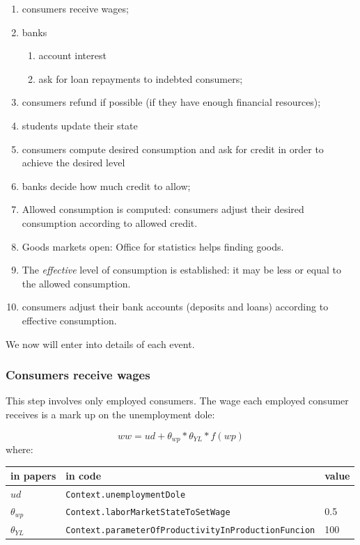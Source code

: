 \documentclass{book}
\begin{document}
\begin{enumerate}
	\item consumers receive wages;
	\item banks 
		\begin{enumerate}
			\item account interest
			\item ask for loan repayments to indebted consumers;
		\end{enumerate}
	\item consumers refund if possible (if they have enough financial resources);
	\item students update their state
	\item consumers compute desired consumption and ask for credit in order to achieve the desired level 
	\item banks decide how much credit to allow;
	\item Allowed consumption is computed: consumers adjust their desired consumption according to allowed credit. 
	\item Goods markets open: Office for statistics helps finding goods.
	\item The \textit{effective} level of consumption is established: it may be less or equal to the allowed consumption.
	\item consumers adjust their bank accounts (deposits and loans) according to effective consumption.
\end{enumerate}

We now will enter into details of each event.

\subsubsection{Consumers receive wages}

This step involves only employed consumers. The wage each employed consumer receives is a mark up on the unemployment dole: 

\begin{equation}
	ww=ud+\theta_{wp}*\theta_{YL}*f(wp)
	\label{eq:ww}
\end{equation}
where:\\

\vskip2mm
\begin{tabular}{l l l}
	\hline
	in papers& in code&value\\
	\hline
	\hline
$ud$&\verb+Context.unemploymentDole+&\\
$\theta_{wp}$&\verb+Context.laborMarketStateToSetWage+&0.5\\
$\theta_{YL}$&\verb+Context.parameterOfProductivityInProductionFuncion+&100\\
	\hline
\end{tabular}
\end{document}
